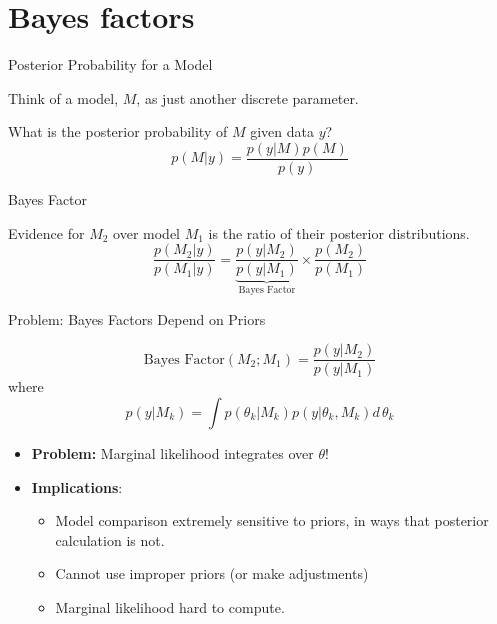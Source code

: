 \documentclass[ignorenonframetext,]{beamer}
\providecommand{\tightlist}{%
  \setlength{\itemsep}{0pt}\setlength{\parskip}{0pt}}
\begin{document}
\hypertarget{bayes-factors}{%
\section{Bayes factors}\label{bayes-factors}}

\begin{frame}{Posterior Probability for a Model}
\protect\hypertarget{posterior-probability-for-a-model}{}

Think of a model, \(M\), as just another discrete parameter.

What is the posterior probability of \(M\) given data \(y\)? \[
p(M | y) = \frac{p(y | M) p(M)}{p(y)}
\]

\end{frame}

\begin{frame}{Bayes Factor}
\protect\hypertarget{bayes-factor}{}

Evidence for \(M_2\) over model \(M_1\) is the ratio of their posterior
distributions. \[
\frac{p(M_2 | y)}{p(M_1 | y)} = \underbrace{\frac{p(y | M_2)}{p(y | M_1)}}_{\text{Bayes Factor}} \times \frac{p(M_2)}{p(M_1)}
\]

\end{frame}

\begin{frame}{Problem: Bayes Factors Depend on Priors}
\protect\hypertarget{problem-bayes-factors-depend-on-priors}{}

\[
\text{Bayes Factor}(M_2; M_1) = \frac{p(y | M_2)}{p(y | M_1)}
\] where \[
p(y | M_k) = \int p(\theta_k | M_k) p(y | \theta_k, M_k) d\,\theta_k
\]

\begin{itemize}
\item
  \textbf{Problem:} Marginal likelihood integrates over \(\theta\)!
\item
  \textbf{Implications}:

  \begin{itemize}
  \tightlist
  \item
    Model comparison extremely sensitive to priors, in ways that
    posterior calculation is not.
  \item
    Cannot use improper priors (or make adjustments)
  \item
    Marginal likelihood hard to compute.
  \end{itemize}
\end{itemize}

\end{frame}
\end{document}
